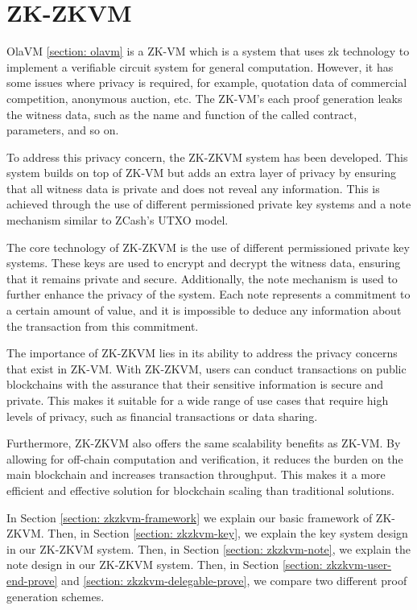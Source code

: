 \section{ZK-ZKVM} \label{sec:zk-zkvm}

OlaVM \ref{section: olavm} is a ZK-VM which is a system that uses zk technology to implement a verifiable circuit system for general computation. However, it has some issues where privacy is required, for example, quotation data of commercial competition, anonymous auction, etc. The ZK-VM's each proof generation leaks the witness data, such as the name and function of the called contract, parameters, and so on.

To address this privacy concern, the ZK-ZKVM system has been developed. This system builds on top of ZK-VM but adds an extra layer of privacy by ensuring that all witness data is private and does not reveal any information. This is achieved through the use of different permissioned private key systems and a note mechanism similar to ZCash's UTXO model.

The core technology of ZK-ZKVM is the use of different permissioned private key systems. These keys are used to encrypt and decrypt the witness data, ensuring that it remains private and secure. Additionally, the note mechanism is used to further enhance the privacy of the system. Each note represents a commitment to a certain amount of value, and it is impossible to deduce any information about the transaction from this commitment.

The importance of ZK-ZKVM lies in its ability to address the privacy concerns that exist in ZK-VM. With ZK-ZKVM, users can conduct transactions on public blockchains with the assurance that their sensitive information is secure and private. This makes it suitable for a wide range of use cases that require high levels of privacy, such as financial transactions or data sharing.

Furthermore, ZK-ZKVM also offers the same scalability benefits as ZK-VM. By allowing for off-chain computation and verification, it reduces the burden on the main blockchain and increases transaction throughput. This makes it a more efficient and effective solution for blockchain scaling than traditional solutions.

In Section \ref{section: zkzkvm-framework} we explain our basic framework of ZK-ZKVM. Then, in Section \ref{section: zkzkvm-key}, we explain the key system design in our ZK-ZKVM system. Then, in Section \ref{section: zkzkvm-note}, we explain the note design in our ZK-ZKVM system. Then, in Section \ref{section: zkzkvm-user-end-prove} and \ref{section: zkzkvm-delegable-prove}, we compare two different proof generation schemes.





